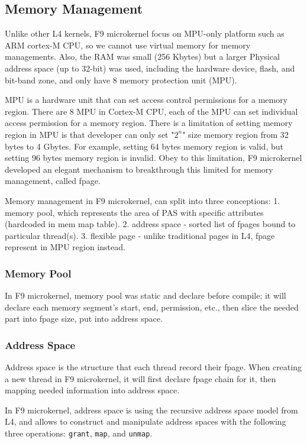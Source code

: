 \documentclass[10pt,preprint,nocopyrightspace]{sigplanconf}
\begin{document}
\subsection{Memory Management}

Unlike other L4 kernels, F9 microkernel focus on MPU-only platform such as ARM cortex-M CPU, so we cannot use virtual memory for memory managements. Also, the RAM was small (256 Kbytes) but a larger Physical address space (up to 32-bit) was used, including the hardware device, flash, and bit-band zone, and only have 8 memory protection unit (MPU)\cite{arm2016mpu,yiu2013definitive,st2016managing,usna2015l18}.

MPU is a hardware unit that can set access control permissions for a memory region. There are 8 MPU in Cortex-M CPU, each of the MPU can set individual access permission for a memory region. There is a limitation of setting memory region in MPU is that developer can only set "$2^n$" size memory region from 32 bytes to 4 Gbytes\cite{yiu2013definitive,st2016managing}. For example, setting 64 bytes memory region is valid, but setting 96 bytes memory region is invalid. Obey to this limitation, F9 microkernel developed an elegant mechanism to breakthrough this limited for memory management, called fpage.

Memory management in F9 microkernel, can split into three conceptions: 1. memory pool, which represents the area of PAS with specific attributes (hardcoded in mem map table). 2. address space - sorted list of fpages bound to particular thread(s). 3. flexible page - unlike traditional pages in L4, fpage represent in MPU region instead. 

\subsubsection{Memory Pool}
In F9 microkernel, memory pool was static and declare before compile; it will declare each memory segment's start, end, permission, etc., then slice the needed part into fpage size, put into address space.

\subsubsection{Address Space}
Address space is the structure that each thread record their fpage. When creating a new thread in F9 microkernel, it will first declare fpage chain for it, then mapping needed information into address space.

In F9 microkernel, address space is using the recursive address space model from L4, and allows to construct and manipulate address spaces with the following three operations: \verb|grant|, \verb|map|, and \verb|unmap|\cite{volp2002design}.
\end{document}
